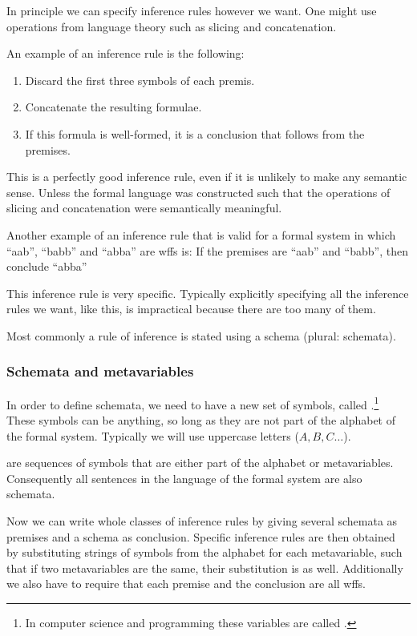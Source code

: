 In principle we can specify inference rules however we want. One might use operations from language theory such as slicing and concatenation.
\begin{example}
An example of an inference rule is the following:
\begin{enumerate}
\item Discard the first three symbols of each premis.
\item Concatenate the resulting formulae.
\item If this formula is well-formed, it is a conclusion that follows from the premises.
\end{enumerate}
This is a perfectly good inference rule, even if it is unlikely to make any semantic sense. Unless the formal language was constructed such that the operations of slicing and concatenation were semantically meaningful.
\end{example}
\begin{example}
Another example of an inference rule that is valid for a formal system in which ``aab'', ``babb'' and ``abba'' are wffs is:
{\centering If the premises are ``aab'' and ``babb'', then conclude ``abba''}

This inference rule is very specific. Typically explicitly specifying all the inference rules we want, like this, is impractical because there are too many of them.
\end{example}

Most commonly a rule of inference is stated using a schema (plural: schemata).

\subsubsection{Schemata and metavariables}
In order to define schemata, we need to have a new set of symbols, called .\footnote{In computer science and programming these variables are called .} These symbols can be anything, so long as they are not part of the alphabet of the formal system. Typically we will use uppercase letters ($A, B, C \ldots$).

 are sequences of symbols that are either part of the alphabet or metavariables. Consequently all sentences in the language of the formal system are also schemata.

Now we can write whole classes of inference rules by giving several schemata as premises and a schema as conclusion. Specific inference rules are then obtained by substituting strings of symbols from the alphabet for each metavariable, such that if two metavariables are the same, their substitution is as well. Additionally we also have to require that each premise and the conclusion are all wffs.


